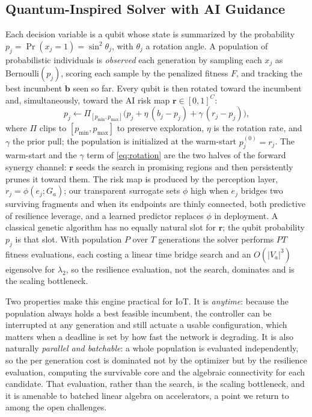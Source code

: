 \documentclass[journal]{IEEEtran}
\begin{document}
\subsection{Quantum-Inspired Solver with AI Guidance}
Each decision variable is a qubit whose state is summarized by the probability $p_j=\Pr(x_j=1)=\sin^2\theta_j$, with $\theta_j$ a rotation angle. A population of probabilistic individuals is \emph{observed} each generation by sampling each $x_j$ as $\mathrm{Bernoulli}(p_j)$, scoring each sample by the penalized fitness $F$, and tracking the best incumbent $\mathbf{b}$ seen so far. Every qubit is then rotated toward the incumbent and, simultaneously, toward the AI risk map $\mathbf{r}\in[0,1]^{C}$:
\begin{equation}
p_j \leftarrow \Pi_{[p_{\min},p_{\max}]}\!\Big(p_j + \eta\,(b_j - p_j) + \gamma\,(r_j - p_j)\Big),
\label{eq:rotation}
\end{equation}
where $\Pi$ clips to $[p_{\min},p_{\max}]$ to preserve exploration, $\eta$ is the rotation rate, and $\gamma$ the prior pull; the population is initialized at the warm-start $p_j^{(0)}=r_j$. The warm-start and the $\gamma$ term of \eqref{eq:rotation} are the two halves of the forward synergy channel: $\mathbf{r}$ seeds the search in promising regions and then persistently prunes it toward them. The risk map is produced by the perception layer, $r_j=\phi(e_j; G_a)$; our transparent surrogate sets $\phi$ high when $e_j$ bridges two surviving fragments and when its endpoints are thinly connected, both predictive of resilience leverage, and a learned predictor replaces $\phi$ in deployment. A classical genetic algorithm has no equally natural slot for $\mathbf{r}$; the qubit probability $p_j$ is that slot. With population $P$ over $T$ generations the solver performs $PT$ fitness evaluations, each costing a linear time bridge search and an $O(|V_a|^3)$ eigensolve for $\lambda_2$, so the resilience evaluation, not the search, dominates and is the scaling bottleneck.

Two properties make this engine practical for IoT. It is \emph{anytime}: because the population always holds a best feasible incumbent, the controller can be interrupted at any generation and still actuate a usable configuration, which matters when a deadline is set by how fast the network is degrading. It is also naturally \emph{parallel and batchable}: a whole population is evaluated independently, so the per generation cost is dominated not by the optimizer but by the resilience evaluation, computing the survivable core and the algebraic connectivity for each candidate. That evaluation, rather than the search, is the scaling bottleneck, and it is amenable to batched linear algebra on accelerators, a point we return to among the open challenges.
\end{document}
